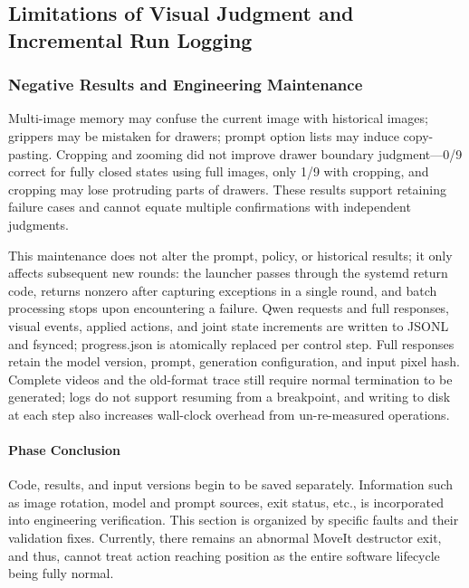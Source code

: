 \subsection{Limitations of Visual Judgment and Incremental Run Logging}\label{s18-detail-9}

\subsubsection{Negative Results and Engineering Maintenance}\label{s18-detail-10}

Multi-image memory may confuse the current image with historical images; grippers may be mistaken for drawers; prompt option lists may induce copy-pasting. Cropping and zooming did not improve drawer boundary judgment—0/9 correct for fully closed states using full images, only 1/9 with cropping, and cropping may lose protruding parts of drawers. These results support retaining failure cases and cannot equate multiple confirmations with independent judgments.

This maintenance does not alter the prompt, policy, or historical results; it only affects subsequent new rounds: the launcher passes through the systemd return code, returns nonzero after capturing exceptions in a single round, and batch processing stops upon encountering a failure. Qwen requests and full responses, visual events, applied actions, and joint state increments are written to JSONL and fsynced; progress.json is atomically replaced per control step. Full responses retain the model version, prompt, generation configuration, and input pixel hash. Complete videos and the old-format trace still require normal termination to be generated; logs do not support resuming from a breakpoint, and writing to disk at each step also increases wall-clock overhead from un-re-measured operations.


\paragraph{Phase Conclusion} Code, results, and input versions begin to be saved separately. Information such as image rotation, model and prompt sources, exit status, etc., is incorporated into engineering verification. This section is organized by specific faults and their validation fixes. Currently, there remains an abnormal MoveIt destructor exit, and thus, cannot treat action reaching position as the entire software lifecycle being fully normal.


